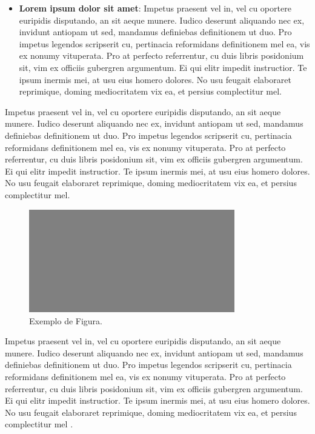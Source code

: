 \begin{itemize}
			\item \textbf{Lorem ipsum dolor sit amet}: Impetus praesent vel in, vel cu oportere euripidis disputando, an sit aeque munere. Iudico deserunt aliquando nec ex, invidunt antiopam ut sed, mandamus definiebas definitionem ut duo. Pro impetus legendos scripserit cu, pertinacia reformidans definitionem mel ea, vis ex nonumy vituperata. Pro at perfecto referrentur, cu duis libris posidonium sit, vim ex officiis gubergren argumentum. Ei qui elitr impedit instructior. Te ipsum inermis mei, at usu eius homero dolores. No usu feugait elaboraret reprimique, doming mediocritatem vix ea, et persius complectitur mel.\newline

		\end{itemize}

		Impetus praesent vel in, vel cu oportere euripidis disputando, an sit aeque munere. Iudico deserunt aliquando nec ex, invidunt antiopam ut sed, mandamus definiebas definitionem ut duo. Pro impetus legendos scripserit cu, pertinacia reformidans definitionem mel ea, vis ex nonumy vituperata. Pro at perfecto referrentur, cu duis libris posidonium sit, vim ex officiis gubergren argumentum. Ei qui elitr impedit instructior. Te ipsum inermis mei, at usu eius homero dolores. No usu feugait elaboraret reprimique, doming mediocritatem vix ea, et persius complectitur mel.

		\begin{figure}[h]
			\centering
			\includegraphics[width=0.8\textwidth]{figuras/fig2.png}
			\setlength{\abovecaptionskip}{10pt}
			\caption{Exemplo de Figura.}
			\label{fig:contexto_nuvem}
		\end{figure}

		Impetus praesent vel in, vel cu oportere euripidis disputando, an sit aeque munere. Iudico deserunt aliquando nec ex, invidunt antiopam ut sed, mandamus definiebas definitionem ut duo. Pro impetus legendos scripserit cu, pertinacia reformidans definitionem mel ea, vis ex nonumy vituperata. Pro at perfecto referrentur, cu duis libris posidonium sit, vim ex officiis gubergren argumentum. Ei qui elitr impedit instructior. Te ipsum inermis mei, at usu eius homero dolores. No usu feugait elaboraret reprimique, doming mediocritatem vix ea, et persius complectitur mel \cite{Avizienis2004}.

